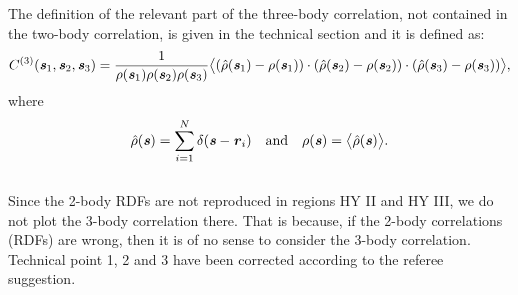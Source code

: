 \documentclass[12pt]{article}
\newcommand{\bluec}[1]{{\color{blue} #1}}
\newcommand{\corr}{C^{(3)}}
\newcommand{\vect}[1]{\textbf{\textit{#1}}}
\begin{document}
The definition of the relevant part of the three-body correlation, not contained in the two-body correlation, is given in the technical section and it is defined as:
\bluec{
\begin{equation}
  \corr (\vect s_1, \vect s_2, \vect s_3)
  =
  \frac1{\rho(\vect s_1)\rho(\vect s_2)\rho(\vect s_3)}
  \big\langle
  (\hat\rho(\vect s_1) - \rho(\vect s_1))\cdot
  (\hat\rho(\vect s_2) - \rho(\vect s_2))\cdot
  (\hat\rho(\vect s_3) - \rho(\vect s_3))
  \big\rangle,
\end{equation}
where
\begin{equation}
  \hat\rho(\vect s) = \sum_{i=1}^N\delta(\vect s - \vect r_i)
  \quad\textrm{and}\quad
  \rho(\vect s) = \big\langle \hat\rho(\vect s)\big\rangle.
\end{equation}
}
\\
\bluec{
Since the 2-body RDFs are not reproduced in regions HY II and HY III,
we do not plot the 3-body correlation there.
That is because, if the 2-body correlations (RDFs) are wrong, then it is of no sense to
consider the 3-body correlation.
}\\

Technical point 1, 2 and 3 have been corrected according to the referee suggestion.\\
\end{document}
